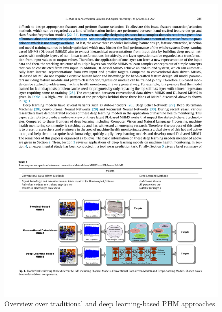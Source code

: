 \begin{figure}[H]
  \centering
  \includegraphics[width=1\textwidth]{hand_crafted_features_physical_models_deep_learning.pdf}
  \caption {Overview over traditional and deep learning-based PHM approaches \cite{ZHAO2019213}} \label{fig:hand_crafted_features_physical_models_deep_learning}
\end{figure}